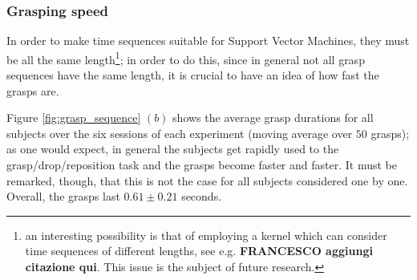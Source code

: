 \subsubsection{Grasping speed}

In order to make time sequences suitable for Support Vector Machines,
they must be all the same length\footnote{an interesting possibility is
that of employing a kernel which can consider time sequences of
different lengths, see e.g. \cite{} {\bf FRANCESCO aggiungi citazione
qui}. This issue is the subject of future research.}; in order to do
this, since in general not all grasp sequences have the same length,
it is crucial to have an idea of how fast the grasps are.

Figure \ref{fig:grasp_sequence} $(b)$ shows the average grasp
durations for all subjects over the six sessions of each experiment
(moving average over $50$ grasps); as one would expect, in general the
subjects get rapidly used to the grasp/drop/reposition task and the
grasps become faster and faster. It must be remarked, though, that
this is not the case for all subjects considered one by one. Overall,
the grasps last $0.61 \pm 0.21$ seconds.
